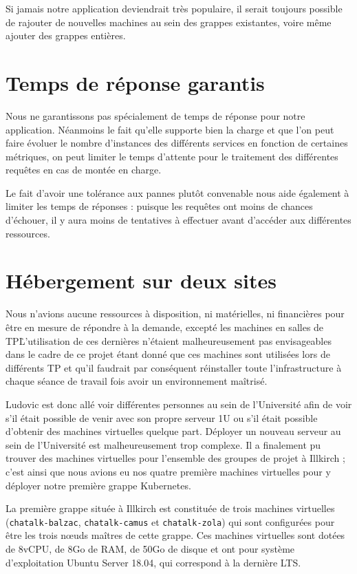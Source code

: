 Si jamais notre application deviendrait très populaire, il serait
toujours possible de rajouter de nouvelles machines au sein des grappes
existantes, voire même ajouter des grappes entières.

\section{Temps de réponse garantis}

Nous ne garantissons pas spécialement de temps de réponse pour notre
application. Néanmoins le fait qu'elle supporte bien la charge et que
l'on peut faire évoluer le nombre d'instances des différents services en
fonction de certaines métriques, on peut limiter le temps d'attente pour
le traitement des différentes requêtes en cas de montée en charge.

Le fait d'avoir une tolérance aux pannes plutôt convenable nous aide
également à limiter les temps de réponses : puisque les requêtes ont
moins de chances d'échouer, il y aura moins de tentatives à effectuer
avant d'accéder aux différentes ressources.

\section{Hébergement sur deux sites}

Nous n'avions aucune ressources à disposition, ni matérielles, ni
financières pour être en mesure de répondre à la demande, excepté les
machines en salles de TP\.
L'utilisation de ces dernières n'étaient malheureusement pas envisageables
dans le cadre de ce projet étant donné que ces machines sont utilisées lors
de différents TP et qu'il faudrait par conséquent réinstaller toute
l'infrastructure à chaque séance de travail fois avoir un environnement maîtrisé.

Ludovic est donc allé voir différentes personnes au sein de l'Université
afin de voir s'il était possible de venir avec son propre serveur 1U ou
s'il était possible d'obtenir des machines virtuelles quelque part.
Déployer un nouveau serveur au sein de l'Université est malheureusement
trop complexe. Il a finalement pu trouver des machines virtuelles pour
l'ensemble des groupes de projet à Illkirch ; c'est ainsi que nous
avions eu nos quatre première machines virtuelles pour y déployer notre
première grappe Kubernetes.

La première grappe située à Illkirch est constituée de trois machines
virtuelles (\texttt{chatalk-balzac}, \texttt{chatalk-camus} et
\texttt{chatalk-zola}) qui sont configurées pour être les trois nœuds
maîtres de cette grappe. Ces machines virtuelles sont dotées de 8vCPU,
de 8Go de RAM, de 50Go de disque et ont pour système d'exploitation
Ubuntu Server 18.04, qui correspond à la dernière LTS.


